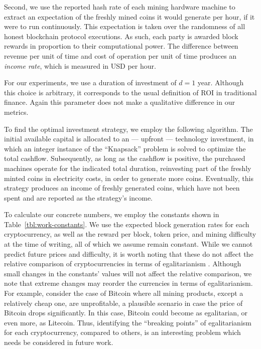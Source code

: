 Second, we use the reported hash rate of each mining hardware machine to
extract an expectation of the freshly mined coins it would generate per hour,
if it were to run continuously. This expectation is taken over the randomness
of all honest blockchain protocol executions. As such, each party is awarded
block rewards in proportion to their computational power. The difference
between revenue per unit of time and cost of operation per unit of time
produces an \emph{income rate}, which is measured in USD per hour.

For our experiments, we use a duration of investment of $d = 1$ year. Although
this choice is arbitrary, it corresponds to the usual definition of ROI in
traditional finance. Again this parameter does not make a qualitative
difference in our metrics.

To find the optimal investment strategy, we employ the following algorithm. The
initial available capital is allocated to an --- upfront --- technology
investment, in which an integer instance of the ``Knapsack'' problem
\cite{mathews1896partition} is solved to optimize the total cashflow.
Subsequently, as long as the cashflow is positive, the purchased machines
operate for the indicated total duration, reinvesting part of the freshly
minted coins in electricity costs, in order to generate more coins. Eventually,
this strategy produces an income of freshly generated coins, which have not
been spent and are reported as the strategy's income.

To calculate our concrete numbers, we employ the constants shown in
Table~\ref{tbl:work-constants}. We use the expected block generation rates for
each cryptocurrency, as well as the reward per block, token price, and mining
difficulty at the time of writing, all of which we assume remain constant.
While we cannot predict future prices and difficulty, it is worth noting that
these do not affect the relative comparison of cryptocurrencies in terms of
egalitarianism .  Although small
changes in the constants' values will not affect the relative comparison, we
note that extreme changes may reorder the currencies in terms of
egalitarianism. For example, consider the case of Bitcoin where all mining
products, except a relatively cheap one, are unprofitable, a plausible scenario
in case \eg the price of Bitcoin drops significantly. In this case, Bitcoin
could become as egalitarian, or even more, as \eg Litecoin. Thus, identifying
the ``breaking points'' of egalitarianism for each cryptocurrency, compared to
others, is an interesting problem which needs be considered in future work.

